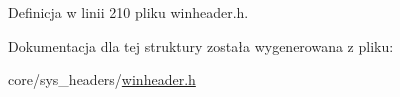 Definicja w linii 210 pliku winheader.\-h.



Dokumentacja dla tej struktury została wygenerowana z pliku\-:\begin{DoxyCompactItemize}
\item 
core/sys\-\_\-headers/\hyperlink{winheader_8h}{winheader.\-h}\end{DoxyCompactItemize}
